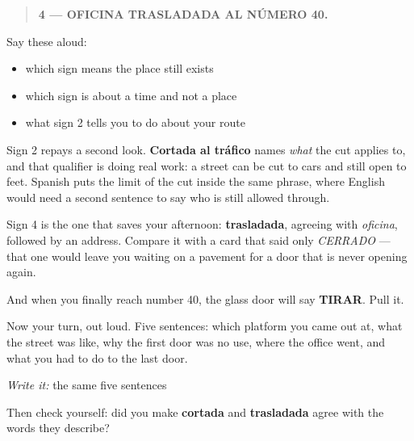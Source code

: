 \begin{quote}
\textbf{4 — OFICINA TRASLADADA AL NÚMERO 40.}
\end{quote}

Say these aloud:

\begin{itemize}
\raggedright
  \item which sign means the place still exists
  \item which sign is about a time and not a place
  \item what sign 2 tells you to do about your route
\end{itemize}

\begin{culture}
Sign 2 repays a second look. \textbf{Cortada al tráfico} names \emph{what} the cut applies to, and that qualifier is doing real work: a street can be cut to cars and still open to feet. Spanish puts the limit of the cut inside the same phrase, where English would need a second sentence to say who is still allowed through.

Sign 4 is the one that saves your afternoon: \textbf{trasladada}, agreeing with \emph{oficina}, followed by an address. Compare it with a card that said only \emph{CERRADO} — that one would leave you waiting on a pavement for a door that is never opening again.

And when you finally reach number 40, the glass door will say \textbf{TIRAR}. Pull it.
\end{culture}

\begin{tcolorbox}[breakable,colback=teal!4,colframe=teal!35!black,title={Before you move on}]
Now your turn, out loud. Five sentences: which platform you came out at, what the street was like, why the first door was no use, where the office went, and what you had to do to the last door.

\emph{Write it:} the same five sentences

Then check yourself: did you make \textbf{cortada} and \textbf{trasladada} agree with the words they describe?
\end{tcolorbox}
